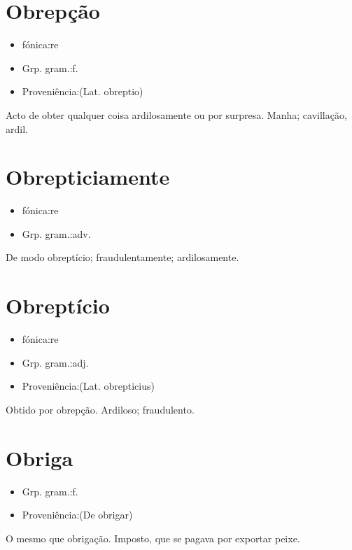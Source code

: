 \section{Obrepção}
\begin{itemize}
\item {fónica:re}
\end{itemize}
\begin{itemize}
\item {Grp. gram.:f.}
\end{itemize}
\begin{itemize}
\item {Proveniência:(Lat. \textunderscore obreptio\textunderscore )}
\end{itemize}
Acto de obter qualquer coisa ardilosamente ou por surpresa.
Manha; cavillação, ardil.
\section{Obrepticiamente}
\begin{itemize}
\item {fónica:re}
\end{itemize}
\begin{itemize}
\item {Grp. gram.:adv.}
\end{itemize}
De modo obreptício; fraudulentamente; ardilosamente.
\section{Obreptício}
\begin{itemize}
\item {fónica:re}
\end{itemize}
\begin{itemize}
\item {Grp. gram.:adj.}
\end{itemize}
\begin{itemize}
\item {Proveniência:(Lat. \textunderscore obrepticius\textunderscore )}
\end{itemize}
Obtido por obrepção.
Ardiloso; fraudulento.
\section{Obriga}
\begin{itemize}
\item {Grp. gram.:f.}
\end{itemize}
\begin{itemize}
\item {Proveniência:(De \textunderscore obrigar\textunderscore )}
\end{itemize}
O mesmo que \textunderscore obrigação\textunderscore .
Imposto, que se pagava por exportar peixe.

